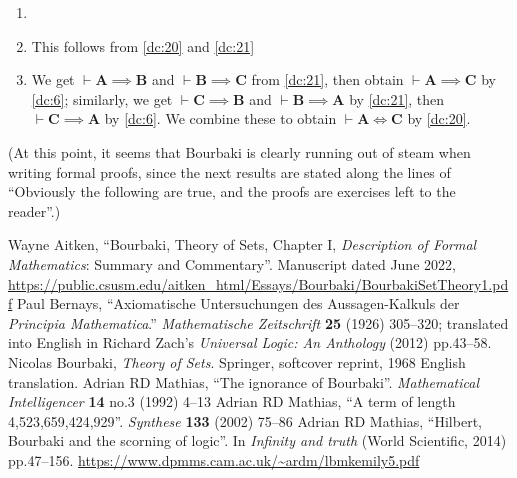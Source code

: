 \documentclass{amsart}%
\newcommand\metavariable[1]{\boldsymbol{#1}}
\begin{document}
\begin{enumerate}[start=0]
\item {}
\item This follows from \ref{dc:20} and \ref{dc:21}
\item We get $\vdash\metavariable{A}\implies\metavariable{B}$ and $\vdash\metavariable{B}\implies\metavariable{C}$
  from \ref{dc:21}, then obtain $\vdash\metavariable{A}\implies\metavariable{C}$
  by \ref{dc:6}; similarly, we get
  $\vdash\metavariable{C}\implies\metavariable{B}$ and $\vdash\metavariable{B}\implies\metavariable{A}$
  by \ref{dc:21}, then $\vdash\metavariable{C}\implies\metavariable{A}$
  by \ref{dc:6}. We combine these to obtain $\vdash\metavariable{A}\iff\metavariable{C}$
  by \ref{dc:20}.
\end{enumerate}
(At this point, it seems that Bourbaki is clearly running out of steam
when writing formal proofs, since the next results are stated along the
lines of ``Obviously the following are true, and the proofs are exercises left to the reader''.)


\begin{thebibliography}{99}
 Wayne Aitken,
  ``Bourbaki, Theory of Sets, Chapter I, \textit{Description of Formal Mathematics}: Summary and Commentary''.
  Manuscript dated June 2022,
  \url{https://public.csusm.edu/aitken_html/Essays/Bourbaki/BourbakiSetTheory1.pdf}
 Paul Bernays, ``Axiomatische Untersuchungen des
Aussagen-Kalkuls der \textit{Principia Mathematica}.''
\textit{Mathematische Zeitschrift} \textbf{25} (1926) 305--320;
translated into English in Richard Zach's \textit{Universal Logic: An
  Anthology} (2012) pp.43--58.
 Nicolas Bourbaki,
  \textit{Theory of Sets}.
  Springer, softcover reprint, 1968 English translation.
  Adrian RD Mathias,
  ``The ignorance of Bourbaki''.
  \textit{Mathematical Intelligencer} \textbf{14} no.3 (1992) 4--13
  Adrian RD Mathias,
  ``A term of length 4,523,659,424,929''.
  \textit{Synthese} \textbf{133} (2002) 75--86
  Adrian RD Mathias,
  ``Hilbert, Bourbaki and the scorning of logic''.
  In \textit{Infinity and truth} (World Scientific, 2014) pp.47--156.
  \url{https://www.dpmms.cam.ac.uk/~ardm/lbmkemily5.pdf}

\end{thebibliography}
\end{document}
